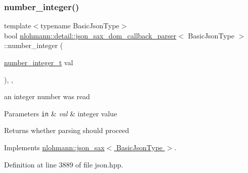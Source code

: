 \subsubsection{\texorpdfstring{number\+\_\+integer()}{number\_integer()}}
{\footnotesize\ttfamily template$<$typename Basic\+Json\+Type$>$ \\
bool \hyperlink{classnlohmann_1_1detail_1_1json__sax__dom__callback__parser}{nlohmann\+::detail\+::json\+\_\+sax\+\_\+dom\+\_\+callback\+\_\+parser}$<$ Basic\+Json\+Type $>$\+::number\+\_\+integer (\begin{DoxyParamCaption}\item[{\hyperlink{structnlohmann_1_1json__sax_a0cef30121f02b7fee85e9708148ea0aa}{number\+\_\+integer\+\_\+t}}]{val }\end{DoxyParamCaption})\hspace{0.3cm}{\ttfamily [inline]}, {\ttfamily [override]}, {\ttfamily [virtual]}}



an integer number was read 


\begin{DoxyParams}[1]{Parameters}
\mbox{\tt in}  & {\em val} & integer value \\
\hline
\end{DoxyParams}
\begin{DoxyReturn}{Returns}
whether parsing should proceed 
\end{DoxyReturn}


Implements \hyperlink{structnlohmann_1_1json__sax_affa7a78b8e9cc9cc3ac99927143142a5}{nlohmann\+::json\+\_\+sax$<$ Basic\+Json\+Type $>$}.



Definition at line 3889 of file json.\+hpp.

\mbox{\label{classnlohmann_1_1detail_1_1json__sax__dom__callback__parser_abdbdf0d6cd07a997217ce74df8a42493}} 
